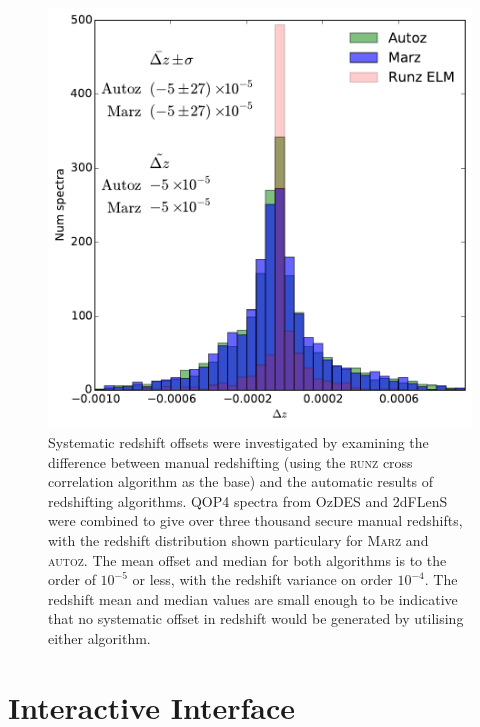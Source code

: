 \documentclass[iop]{emulateapj}
\newcommand{\runz}{\textsc{runz}}
\newcommand{\autoz}{\textsc{autoz}}
\newcommand{\marz}{\textsc{Marz}}
\begin{document}
\begin{figure}[h]
\centering
\includegraphics[width=\columnwidth]{systematic.pdf}
\caption{Systematic redshift offsets were investigated by examining the difference between manual redshifting (using the \runz{} cross correlation algorithm as the base) and the automatic results of redshifting algorithms. QOP4 spectra from OzDES and 2dFLenS were combined to give over three thousand secure manual redshifts, with the redshift distribution shown particulary for \marz{} and \autoz{}. The mean offset and median for both algorithms is to the order of $10^{-5}$ or less, with the redshift variance on order $10^{-4}$. The redshift mean and median values are small enough to be indicative that no systematic offset in redshift would be generated by utilising either algorithm.}
\label{fig:systematic}
\end{figure}

















\section{Interactive Interface}
\end{document}
